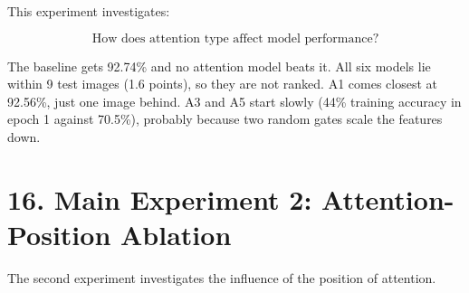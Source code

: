 \documentclass[10pt]{article}
\begin{document}
This experiment investigates:

\[
\boxed{
\text{How does attention type affect model performance?}
}
\]

\begin{table}[H]
\centering
\caption{Attention-type ablation at $P_3$ (after conv4\_x). Inference time is in ms per image (batch of 32).}
\label{tab:type}
\end{table}

The baseline gets 92.74\% and no attention model beats it. All six models lie within 9 test images (1.6 points), so they are not ranked. A1 comes closest at 92.56\%, just one image behind. A3 and A5 start slowly (44\% training accuracy in epoch 1 against 70.5\%), probably because two random gates scale the features down.

\section*{16. Main Experiment 2: Attention-Position Ablation}

The second experiment investigates the influence of the position of
attention.
\end{document}
